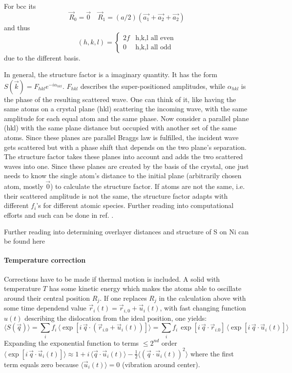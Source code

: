 For bcc its $$ \vec{R}_0 = \vec{0} \quad
 \vec{R}_1 = (a/2)(\vec{a_1} + \vec{a_2}+ \vec{a_2})$$ and thus 
 $$(h,k,l)=\begin{cases} 2f &\mbox{h,k,l all even}\\
                  0 &\mbox{h,k,l all odd} \end{cases}$$ due to the different basis.

In general, the structure factor is a imaginary quantity. It has the form $S(\vec k)=F_{hkl}e^{-i\alpha_{hkl}}$. $F_{hkl}$ describes the super-positioned amplitudes, while $\alpha_{hkl}$ is the phase of the resulting scattered wave. One can think of it, like having the same atoms on a crystal plane (hkl) scattering the incoming wave, with the same amplitude for each equal atom and the same phase. Now consider a parallel plane (hkl) with the same plane distance but occupied with another set of the same atoms. Since these planes are parallel Braggs law is fulfilled, the incident wave gets scattered but with a phase shift that depends on the two plane's separation. The structure factor takes these planes into account and adds the two scattered waves into one. Since these planes are created by the basis of the crystal, one just needs to know the single atom's distance to the initial plane (arbitrarily chosen atom, mostly $\vec 0$) to calculate the structure factor. If atoms are not the same, i.e. their scattered amplitude is not the same, the structure factor adapts with different $f_i$'s for different atomic species. Further reading into computational efforts and such can be done in ref. \cite{van_hove_surface_1979}.

Further reading into determining overlayer distances and structure of S on Ni can be found here \cite{demuth_small_1973,duke_structure_1973,andersson_surface_1972}
\paragraph{Temperature correction}
Corrections have to be made if thermal motion is included. A solid with temperature $T$ has some kinetic energy which makes the atoms able to oscillate around their central position $R_j$. If one replaces $R_j$ in the calculation above with some time dependend value $\vec r_i(t)=\vec r_{i,0}+\vec u_i(t)$, with fast changing function $u(t)$ describing the dislocation from the ideal position, one yields:
$$ \langle S(\vec q) \rangle =\sum_{i}f_{i}\,\langle\exp\left[i\,\vec{q}\cdot\left(\vec{r}_{i.0}+\vec{u}_{i}(t)\right)\right]\rangle=\sum_{i}f_{i}\,\exp\left[i\,\vec{q}\cdot\vec{r}_{i.0}\right]\,\langle\exp\left[i\,\vec{q}\cdot\vec{u}_{i}(t)\right]\rangle $$
Expanding the exponential function to terms $\leq 2^{nd}$ order 
$\langle \exp\left[i\,\vec{q}\cdot\vec{u}_{i}(t)\right] \rangle \approx 1+i\,\langle \vec{q}\cdot\vec{u}_{i}(t)\rangle-\frac{1}{2}\langle\left(\vec{q}\cdot\vec{u}_{i}(t)\right)^2\rangle$ where the first term equals zero because $\langle \vec{u}_i(t)\rangle=0$ (vibration around center).

